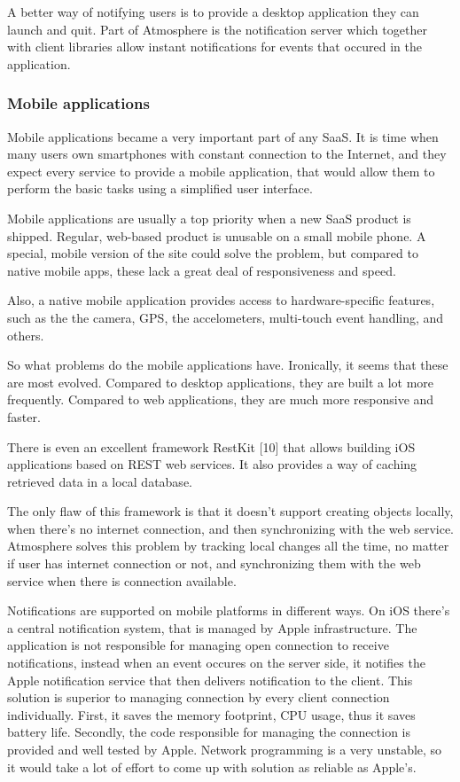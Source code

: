 A better way of notifying users is to provide a desktop application they can launch and quit. Part of Atmosphere is the notification server which together with client libraries allow instant notifications for events that occured in the application. 

\subsubsection{Mobile applications}

Mobile applications became a very important part of any SaaS. It is time when many users own smartphones with constant connection to the Internet, and they expect every service to provide a mobile application, that would allow them to perform the basic  tasks using a simplified user interface. 

Mobile applications are usually a top priority when a new SaaS product is shipped. Regular, web-based product is unusable on a small mobile phone. A special, mobile version of the site could solve the problem, but compared to native mobile apps, these lack a great deal of responsiveness and speed.

Also, a native mobile application provides access to hardware-specific features, such as the the camera, GPS, the accelometers, multi-touch event handling, and others. 

So what problems do the mobile applications have. Ironically, it seems that these are most evolved. Compared to desktop applications, they are built a lot more frequently. Compared to web applications, they are much more responsive and faster. 

There is even an excellent framework RestKit [10] that allows building iOS applications based on REST web services. It also provides a way of caching retrieved data in a local database.

The only flaw of this framework is that it doesn’t support creating objects locally, when there’s no internet connection, and then synchronizing with the web service. Atmosphere solves this problem by tracking local changes all the time, no matter if user has internet connection or not, and synchronizing them with the web service when there is connection available.

Notifications are supported on mobile platforms in different ways. On iOS there’s a central notification system, that is managed by Apple infrastructure. The application is not responsible for managing open connection to receive notifications, instead when an event occures on the server side, it notifies the Apple notification service that then delivers notification to the client. This solution is superior to managing connection by every client connection individually. First, it saves the memory footprint, CPU usage, thus it saves battery life. Secondly, the code responsible for managing the connection is provided and well tested by Apple. Network programming is a very unstable, so it would take a lot of effort to come up with solution as reliable as Apple’s. 


